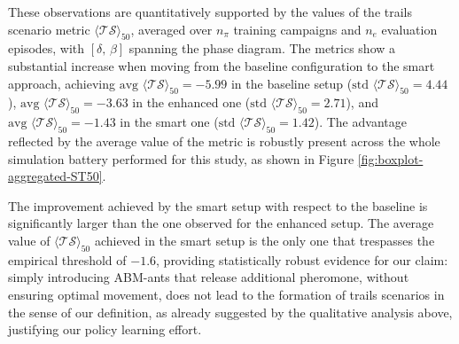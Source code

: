 \documentclass[pdflatex,sn-mathphys-num]{sn-jnl}%
\theoremstyle{thmstyleone}%
\theoremstyle{thmstyletwo}%
\theoremstyle{thmstylethree}%
\begin{document}
These observations are quantitatively supported by %
 the values of the trails scenario metric %
 $\langle \mathcal{TS} \rangle_{50}$, averaged over $n_{\pi}$ training campaigns and $n_{e}$ evaluation episodes, with $\left[ \delta, \, \beta \right]$ spanning the phase diagram. %
 The metrics show a substantial increase when moving from the baseline configuration to the smart approach, achieving $\text{avg}\,\,\langle \mathcal{TS} \rangle_{50} = -5.99$ in the baseline setup ($\text{std}\,\,\langle \mathcal{TS} \rangle_{50} = 4.44$), $\text{avg}\,\, \langle \mathcal{TS} \rangle_{50} = -3.63$ in the enhanced one ($\text{std}\,\,\langle \mathcal{TS} \rangle_{50} = 2.71$), and $\text{avg}\,\, \langle \mathcal{TS} \rangle_{50} = -1.43$ in the smart one ($\text{std}\,\,\langle \mathcal{TS} \rangle_{50} = 1.42$). The advantage reflected by the average value of the metric is robustly present across the whole simulation battery performed for this study, as shown in Figure \ref{fig:boxplot-aggregated-ST50}. 
 
The improvement achieved by the smart setup with respect to the baseline is significantly larger than the one observed for the enhanced setup. The average value of $\langle \mathcal{TS} \rangle_{50}$ achieved in the smart setup is the only one that trespasses the empirical threshold of $-1.6$, providing statistically robust evidence for our claim: simply introducing ABM-ants that release additional pheromone, without ensuring optimal movement, does not lead to the formation of trails scenarios in the sense of our definition, as already suggested by the qualitative analysis above, justifying our policy learning effort. 
\end{document}
